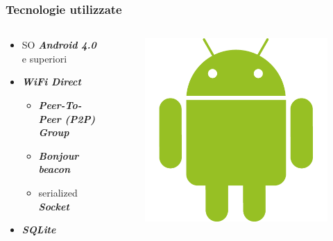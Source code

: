 \documentclass{beamer}
\begin{document}
\begin{frame}
  \frametitle{Tecnologie utilizzate}
  \begin{columns}
   \begin{column}{0.5\textwidth}
    \begin{itemize}
      \item SO \textit{\textbf{Android 4.0}} e superiori\vspace{5mm}
      \item \textit{\textbf{WiFi Direct}}
      \begin{itemize}\vspace{1mm}
      \item \textit{\textbf{Peer-To-Peer (P2P) Group}}\vspace{1mm}
      \item \textit{\textbf{Bonjour beacon}}\vspace{1mm}
      \item serialized \textit{\textbf{Socket}}\vspace{5mm}
      \end{itemize}
      \item \textit{\textbf{SQLite}}\vspace{5mm}
    \end{itemize}
   \end{column}
   \begin{column}{0.5\textwidth}
    \begin{figure}
      \includegraphics[scale=0.08]{img/android.png}

\end{figure}
\end{column}
\end{columns}
\end{frame}
\end{document}

